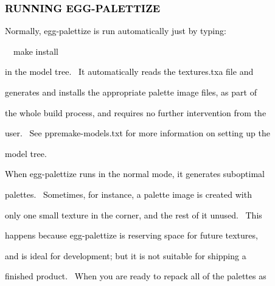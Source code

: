 \documentclass[a4paper]{article}
\newcommand\textstyleOOoComputerKeyWord[1]{\textrm{\textcolor[rgb]{0.0,0.0,0.5019608}{#1}}}
\begin{document}
\bigskip

\subsubsection[RUNNING EGG{}-PALETTIZE]{\textstyleOOoComputerKeyWord{\textcolor{black}{RUNNING EGG-PALETTIZE}}}
\hypertarget{RefHeading7666869075401}{}
\bigskip

{\color{black}
\textstyleOOoComputerKeyWord{\textcolor{black}{Normally, egg-palettize is run automatically just by typing:}}}


\bigskip

{\color{black}
\textstyleOOoComputerKeyWord{\textcolor{black}{\ \ make install}}}


\bigskip

{\color{black}
\textstyleOOoComputerKeyWord{\textcolor{black}{in the model tree. \ It automatically reads the textures.txa file and}}}

{\color{black}
\textstyleOOoComputerKeyWord{\textcolor{black}{generates and installs the appropriate palette image files, as part of}}}

{\color{black}
\textstyleOOoComputerKeyWord{\textcolor{black}{the whole build process, and requires no further intervention from the}}}

{\color{black}
\textstyleOOoComputerKeyWord{\textcolor{black}{user. \ See ppremake-models.txt for more information on setting up the}}}

{\color{black}
\textstyleOOoComputerKeyWord{\textcolor{black}{model tree.}}}


\bigskip

{\color{black}
\textstyleOOoComputerKeyWord{\textcolor{black}{When egg-palettize runs in the normal mode, it generates suboptimal}}}

{\color{black}
\textstyleOOoComputerKeyWord{\textcolor{black}{palettes. \ Sometimes, for instance, a palette image is created with}}}

{\color{black}
\textstyleOOoComputerKeyWord{\textcolor{black}{only one small texture in the corner, and the rest of it unused.
\ This}}}

{\color{black}
\textstyleOOoComputerKeyWord{\textcolor{black}{happens because egg-palettize is reserving space for future textures,}}}

{\color{black}
\textstyleOOoComputerKeyWord{\textcolor{black}{and is ideal for development; but it is not suitable for shipping a}}}

{\color{black}
\textstyleOOoComputerKeyWord{\textcolor{black}{finished product. \ When you are ready to repack all of the palettes
as}}}
\end{document}
